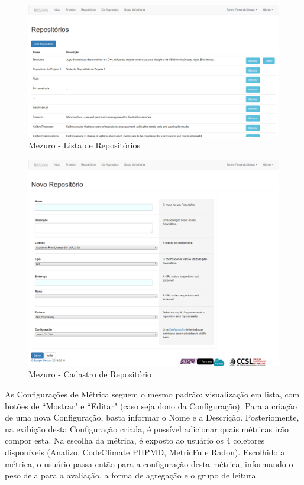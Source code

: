 \begin{figure}[!htb]
	\centering
    \includegraphics[keepaspectratio=true,scale=0.3]
    {figuras/mezuro-repositorios-v2.eps}
  \caption{Mezuro - Lista de Repositórios}
	\label{fig:mezuro-repositorios-v2}
\end{figure}

\newpage

\begin{figure}[!htb]
	\centering
    \includegraphics[keepaspectratio=true,scale=0.3]
    {figuras/mezuro-repositorio-cadastro.eps}
  \caption{Mezuro - Cadastro de Repositório}
	\label{fig:mezuro-repositorio-cadastro}
\end{figure}

\newpage

As Configurações de Métrica seguem o mesmo padrão: visualização em lista, com
botões de ``Mostrar" e ``Editar" (caso seja dono da Configuração). Para a criação
de uma nova Configuração, basta informar o Nome e a Descrição. Posteriomente, na
exibição desta Configuração criada, é possível adicionar quais métricas irão
compor esta. Na escolha da métrica, é exposto ao usuário os 4 coletores
disponíveis (Analizo, CodeClimate PHPMD, MetricFu e Radon). Escolhido a métrica,
o usuário passa então para a configuração desta métrica, informando o peso dela
para a avaliação, a forma de agregação e o grupo de leitura.

